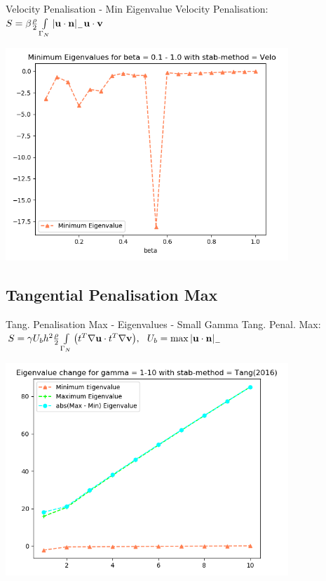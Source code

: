 \begin{frame}{Velocity Penalisation - Min Eigenvalue}
Velocity Penalisation:
      \(
      S = \beta\frac{\rho}{2}\int\limits_{\Gamma_{N}} \abs{{\textbf{u}} \cdot {\textbf{n}} }_- {\textbf{u}} \cdot {\textbf{v}}
      \)
    \begin{center}
        \includegraphics[width=0.8\textwidth]{Media/Beta_1_thru_0_velo_min.png}
    \end{center}
\end{frame}

\subsection{Tangential Penalisation Max}
\begin{frame}{Tang. Penalisation Max - Eigenvalues - Small Gamma}
Tang. Penal. Max: \(      S = \gamma U_b h^2 \frac{\rho}{2} \int\limits_{\Gamma_{N}} \qty(t^{T}\nabla{\textbf{u}} \cdot t^{T}\nabla{\textbf{v}}),  ~~U_b = \max \abs{{\textbf{u}} \cdot {\textbf{n}}}_-\)
    \begin{center}
        \includegraphics[width=0.8\textwidth]{Media/Gamma_1_thru_10_tang(2016).png}
    \end{center}
\end{frame}

